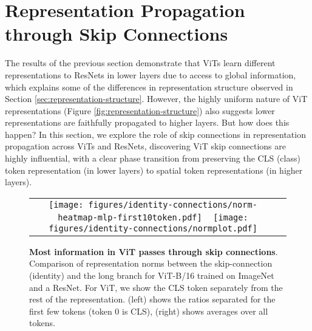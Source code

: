 \documentclass{article}
\begin{document}
\section{Representation Propagation through Skip Connections}
\label{sec:skip-connections}
The results of the previous section demonstrate that ViTs learn different representations to ResNets in lower layers due to access to global information, which explains some of the differences in representation structure observed in Section \ref{sec:representation-structure}. However, the highly uniform nature of ViT representations (Figure \ref{fig:representation-structure}) also suggests lower representations are faithfully propagated to higher layers. But how does this happen? In this section, we explore the role of skip connections in representation propagation across ViTs and ResNets, discovering ViT skip connections are highly influential, with a clear phase transition from preserving the CLS (class) token representation (in lower layers) to spatial token representations (in higher layers).

\begin{figure}[t!]
    \centering
    \begin{tabular}{cc}
        \texttt{[image: figures/identity-connections/norm-heatmap-mlp-first10token.pdf]} ~
        \texttt{[image: figures/identity-connections/normplot.pdf]}
    \end{tabular}
    \caption{\textbf{Most information in ViT passes through skip connections}. Comparison of representation norms between the skip-connection (identity) and the long branch for ViT-B/16 trained on ImageNet and a ResNet. For ViT, we show the CLS token separately from the rest of the representation. (left) shows the ratios separated for the first few tokens (token 0 is CLS), (right) shows averages over all tokens.}
    \label{fig:identity-connection-norms-vit}

    \label{fig:identity-connection-norms-line-plot}
\end{figure}
\end{document}
